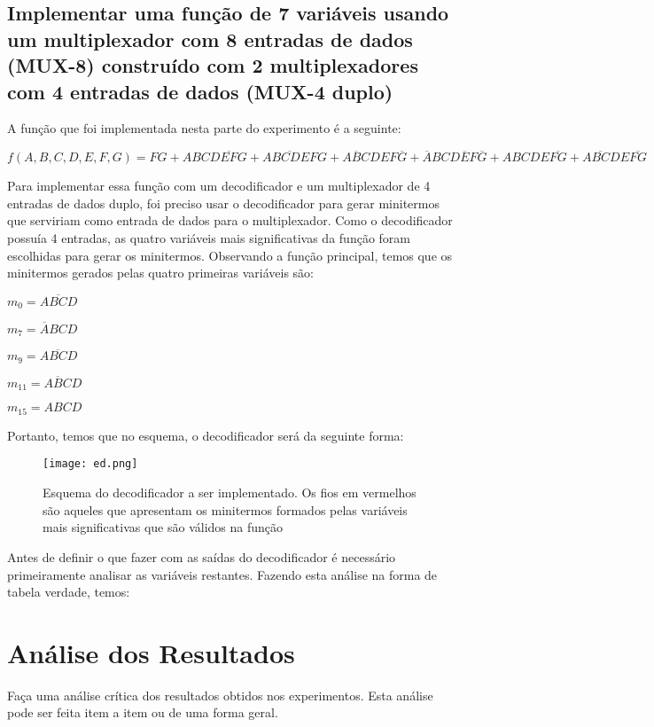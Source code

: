 \documentclass[12pt]{article}
\begin{document}
\subsection{Implementar uma função de 7 variáveis usando um multiplexador com 8 entradas de dados (MUX-8) construído com 2 multiplexadores com 4 entradas de dados (MUX-4 duplo)}

A função que foi implementada nesta parte do experimento é a seguinte:

$f(A,B,C,D,E,F,G) = FG + ABCD\overline{EF}G + \overline{ABCDEF}G + A\overline{B}CDEF\overline{G} + \overline{A}BCD\overline{E}F\overline{G} + ABCDE\overline{FG} + A\overline{BC}DE\overline{FG}$

Para implementar essa função com um decodificador e um multiplexador de 4 entradas de dados duplo, foi preciso usar o decodificador para gerar minitermos que serviriam como entrada de dados para o multiplexador. Como o decodificador possuía 4 entradas, as quatro variáveis mais significativas da função foram escolhidas para gerar os minitermos. Observando a função principal, temos que os minitermos gerados pelas quatro primeiras variáveis são:

$m_{0}=\overline{ABCD}$

$m_{7}=\overline{A}BCD$

$m_{9}=A\overline{BC}D$

$m_{11}=A\overline{B}CD$

$m_{15}=ABCD$

Portanto, temos que no esquema, o decodificador será da seguinte forma: 

\begin{figure}[H]
	\centering
	\texttt{[image: ed.png]}
	\caption{Esquema do decodificador a ser implementado. Os fios em vermelhos são aqueles que apresentam os minitermos formados pelas variáveis mais significativas  que são válidos na função}
	\label{fig:edd}
\end{figure}

Antes de definir o que fazer com as saídas do decodificador é necessário primeiramente analisar as variáveis restantes. Fazendo esta análise na forma de tabela verdade, temos:


\section{Análise dos Resultados}
\label{sec:Resultados}

Faça uma análise crítica dos resultados obtidos nos experimentos. Esta análise pode ser feita item a item ou de uma forma geral.
\end{document}
